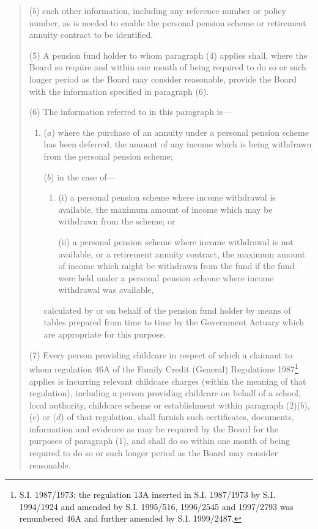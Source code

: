 \documentclass[12pt,a4paper]{article}
\begin{document}
\begin{quotation}
\begin{enumerate}
($b$) such other information, including any reference number or policy number, as is needed to enable the personal pension scheme or retirement annuity contract to be identified.
\end{enumerate}

\pagebreak[3]

(5) A pension fund holder to whom paragraph (4) applies shall, where the Board so require and within one month of being required to do so or such longer period as the Board may consider reasonable, provide the Board with the information specified in paragraph (6).

(6) The information referred to in this paragraph is—
\begin{enumerate}\item[]
($a$) where the purchase of an annuity under a personal pension scheme has been deferred, the amount of any income which is being withdrawn from the personal pension scheme;

($b$) in the case of—
\begin{enumerate}\item[]
(i) a personal pension scheme where income withdrawal is available, the maximum amount of income which may be withdrawn from the scheme; or

(ii) a personal pension scheme where income withdrawal is not available, or a retirement annuity contract, the maximum amount of income which might be withdrawn from the fund if the fund were held under a personal pension scheme where income withdrawal was available,
\end{enumerate}
calculated by or on behalf of the pension fund holder by means of tables prepared from time to time by the Government Actuary which are appropriate for this purpose.
\end{enumerate}

(7) Every person providing childcare in respect of which a claimant to whom regulation 46A of the Family Credit (General) Regulations 1987\footnote{\frenchspacing S.I. 1987/1973; the regulation 13A inserted in S.I. 1987/1973 by S.I. 1994/1924 and amended by S.I. 1995/516, 1996/2545 and 1997/2793 was renumbered 46A and further amended by S.I. 1999/2487.} applies is incurring relevant childcare charges (within the meaning of that regulation), including a person providing childcare on behalf of a school, local authority, childcare scheme or establishment within paragraph (2)($b$), ($c$)  or ($d$)  of that regulation, shall furnish such certificates, documents, information and evidence as may be required by the Board for the purposes of paragraph (1), and shall do so within one month of being required to do so or such longer period as the Board may consider reasonable.


\end{quotation}
\end{document}
